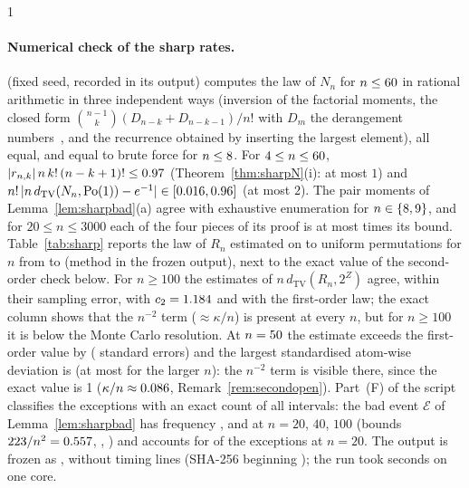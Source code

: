 \documentclass[11pt,a4paper]{article}
\providecommand{\HasSharp}{0}
\providecommand{\HasSecond}{0}
\theoremstyle{plain}
\theoremstyle{definition}
\theoremstyle{remark}
\begin{document}
\if\HasSharp1
\paragraph{Numerical check of the sharp rates.}
 (fixed seed, recorded in its output) computes the law of $N_n$ for $n\le60$ in rational arithmetic in three independent ways (inversion of the factorial moments, the closed form $\binom{n-1}{k}(D_{n-k}+D_{n-k-1})/n!$ with $D_m$ the derangement numbers~\citep{kaplansky1945}, and the recurrence obtained by inserting the largest element), all equal, and equal to brute force for $n\le8$. For $4\le n\le60$, $|r_{n,k}|\,n\,k!\,(n-k+1)!\le0.97$ (Theorem~\ref{thm:sharpN}(i): at most $1$) and $n!\,|n\,d_{\mathrm{TV}}(N_n,\mathrm{Po}(1))-e^{-1}|\in[0.016,0.96]$ (at most $2$). The pair moments of Lemma~\ref{lem:sharpbad}(a) agree with exhaustive enumeration for $n\in\{8,9\}$, and for $20\le n\le3000$ each of the four pieces of its proof is at most \SharpPieceMax{} times its bound. Table~\ref{tab:sharp} reports the law of $R_n$ estimated on \SharpMCsamplesMin{} to \SharpMCsamplesMax{} uniform permutations for $n$ from \SharpMCnlo{} to \SharpMCnhi{} (method in the frozen output), next to the exact value of the second-order check below. For $n\ge100$ the estimates of $n\,d_{\mathrm{TV}}(R_n,2^Z)$ agree, within their sampling error, with $c_2=1.184$ and with the first-order law; the exact column shows that the $n^{-2}$ term ($\approx\kappa/n$) is present at every $n$, but for $n\ge100$ it is below the Monte Carlo resolution. At $n=50$ the estimate \SharpFiftyMC{} exceeds the first-order value \SharpFiftyFirst{} by \SharpFiftyExcess{} (\SharpFiftyZ{} standard errors) and the largest standardised atom-wise deviation is \SharpMCzFirst{} (at most \SharpMCzRestMax{} for the larger $n$): the $n^{-2}$ term is visible there, since the exact value is \if\HasSecond1\SecExactFifty{} ($\kappa/n\approx0.086$, Remark~\ref{rem:secondopen})\fi. Part~(F) of the script classifies the exceptions with an exact count of all intervals: the bad event $\mathcal E$ of Lemma~\ref{lem:sharpbad} has frequency \SharpFTwentyPE, \SharpFFortyPE{} and \SharpFHundredPE{} at $n=20$, $40$, $100$ (bounds $223/n^2=0.557$, \SharpFFortyPEbound, \SharpFHundredPEbound) and accounts for \SharpFTwentyExcBad{} of the \SharpFTwentyExc{} exceptions at $n=20$. The output is frozen as , without timing lines (SHA-256 beginning \texttt{\SharpSha}); the run took \SharpSeconds{} seconds on one core.
\end{document}
